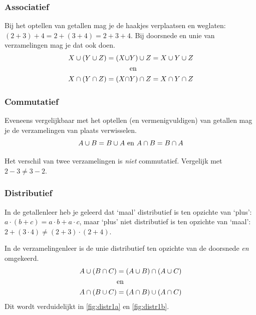 \subsubsection{Associatief}
Bij het optellen van getallen mag je de haakjes verplaatsen en weglaten:
$(2+3)+4=2+(3+4)=2+3+4$. Bij doorsnede en unie van verzamelingen mag je dat ook doen.
\begin{equation*}
\begin{split}
X\cup (Y\cup Z)=(X\cup &Y)\cup Z =X\cup Y\cup Z 
\\ &\mathrm{en}\\
X\cap (Y\cap Z)=(X\cap &Y)\cap Z = X\cap Y\cap Z
\end{split}
\end{equation*}
\subsubsection{Commutatief}
Eveneens vergelijkbaar met het optellen (en vermenigvuldigen) van getallen mag je de verzamelingen van plaats verwisselen.
\begin{equation*}
A\cup B=B\cup A ~\mathrm{en}~A\cap B=B\cap A
\end{equation*}

Het verschil van twee verzamelingen is \emph{niet} commutatief. Vergelijk met $2-3\not = 3-2$.

\subsubsection{Distributief}
In de getallenleer heb je geleerd dat `maal' distributief is ten opzichte van `plus': $a\cdot (b+c)=a\cdot b+a\cdot c$, maar `plus' niet distributief is ten opzichte van `maal': $2+(3\cdot 4)\not = (2+3)\cdot (2+4)$. 

In de verzamelingenleer is de unie distributief ten opzichte van de doorsnede \emph{en} omgekeerd. 
\begin{equation*}
\begin{split}
A\cup(B\cap C)&=(A\cup B) \cap (A\cup C) \\ &\mathrm{en} \\ A\cap (B\cup C)&=(A\cap B)\cup (A\cap C)
\end{split}
\end{equation*}
Dit wordt verduidelijkt in \cref{fig:distr1a} en \cref{fig:distr1b}. 

